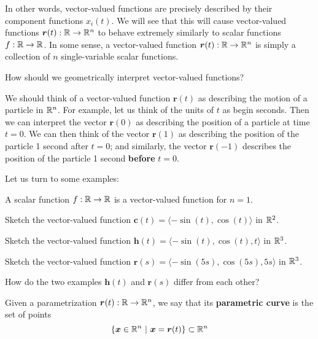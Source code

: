 In other words, vector-valued functions are precisely described by their component functions $x_i(t)$.  We will see that this will cause vector-valued functions $\bm{r}(t) : \mathbb{R} \to \mathbb{R}^n$ to behave extremely similarly to scalar functions $f : \mathbb{R} \to \mathbb{R}$.  In some sense, a vector-valued function $\bm{r}(t) : \mathbb{R} \to \mathbb{R}^n$ is simply a collection of $n$ single-variable scalar functions.


\begin{motivating}
How should we geometrically interpret vector-valued functions?
\end{motivating}

We should think of a vector-valued function $\bm{r}(t)$ as describing the motion of a particle in $\mathbb{R}^n$.  For example, let us think of the units of $t$ as begin seconds.  Then we can interpret the vector $\bm{r}(0)$ as describing the position of a particle at time $t=0$.  We can then think of the vector $\bm{r}(1)$ as describing the position of the particle 1 second after $t=0$; and similarly, the vector $\bm{r}(-1)$ describes the position of the particle 1 second \textbf{before} $t=0$.  

Let us turn to some examples:

\begin{example}
A scalar function $f : \mathbb{R} \to \mathbb{R}$ is a vector-valued function for $n=1$.
\end{example}


\begin{example}
Sketch the vector-valued function $\bm{c}(t) = \langle  -\sin(t), \cos(t) \rangle$ in $\mathbb{R}^2$.
\end{example}


\begin{example}\label{helix1}
Sketch the vector-valued function $\bm{h}(t) = \langle -\sin(t), \cos(t), t \rangle$ in $\mathbb{R}^3$.
\end{example}

\begin{example}\label{helix2}
Sketch the vector-valued function $\bm{r}(s) = \langle -\sin(5s), \cos(5s), 5s \rangle$ in $\mathbb{R}^3$.
\end{example}

\begin{motivating}
How do the two examples \hyperref[helix1]{$\bm{h}(t)$} and \hyperref[helix2]{$\bm{r}(s)$} differ from each other?
\end{motivating}

\begin{definition}

    Given a parametrization $\bm{r}(t) : \mathbb{R} \to \mathbb{R}^n$, we say that its \textbf{parametric curve} is the set of points $$\{\bm{x} \in \R^n \ | \ \bm{x} = \bm{r}(t)\} \subset \R^n$$
    
\end{definition}

